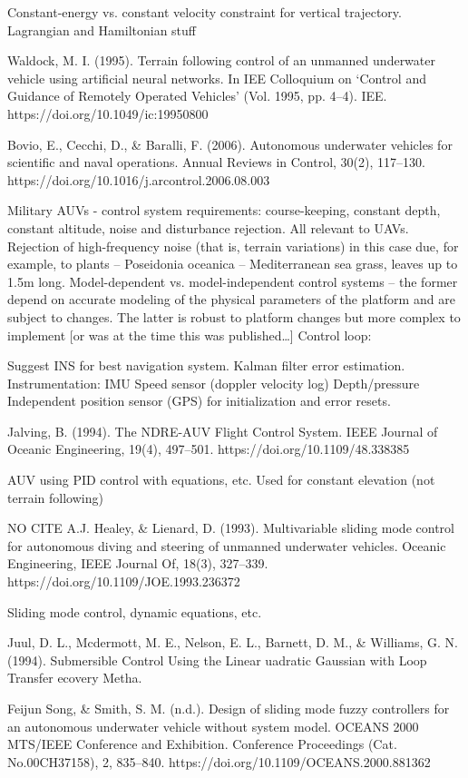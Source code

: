 Constant-energy vs. constant velocity constraint for vertical trajectory.
Lagrangian and Hamiltonian stuff

\cite{Waldock1995}
Waldock, M. I. (1995). Terrain following control of an unmanned underwater vehicle using artificial neural networks. In IEE Colloquium on `Control and Guidance of Remotely Operated Vehicles’ (Vol. 1995, pp. 4–4). IEE. https://doi.org/10.1049/ic:19950800

\cite{Bovio2006}
Bovio, E., Cecchi, D., \& Baralli, F. (2006). Autonomous underwater vehicles for scientific and naval operations. Annual Reviews in Control, 30(2), 117–130. https://doi.org/10.1016/j.arcontrol.2006.08.003

Military AUVs - control system requirements: course-keeping, constant depth, constant altitude, noise and disturbance rejection. All relevant to UAVs.
Rejection of high-frequency noise (that is, terrain variations) in this case due, for example, to plants -- Poseidonia oceanica -- Mediterranean sea grass, leaves up to 1.5m long.
Model-dependent vs. model-independent control systems -- the former depend on accurate modeling of the physical parameters of the platform and are subject to changes. The latter is robust to platform changes but more complex to implement [or was at the time this was published…]
Control loop:

Suggest INS for best navigation system.
Kalman filter error estimation.
Instrumentation:
IMU
Speed sensor (doppler velocity log)
Depth/pressure
Independent position sensor (GPS) for initialization and error resets.

\cite{Jalving1994}
Jalving, B. (1994). The NDRE-AUV Flight Control System. IEEE Journal of Oceanic Engineering, 19(4), 497–501. https://doi.org/10.1109/48.338385

AUV using PID control with equations, etc.
Used for constant elevation (not terrain following)

NO CITE
A.J. Healey, \& Lienard, D. (1993). Multivariable sliding mode control for autonomous diving and steering of unmanned underwater vehicles. Oceanic Engineering, IEEE Journal Of, 18(3), 327–339. https://doi.org/10.1109/JOE.1993.236372

Sliding mode control, dynamic equations, etc.

\cite{Juul1994}
Juul, D. L., Mcdermott, M. E., Nelson, E. L., Barnett, D. M., \& Williams, G. N. (1994). Submersible Control Using the Linear uadratic Gaussian with Loop Transfer ecovery Metha.

\cite{FeijunSong}
Feijun Song, \& Smith, S. M. (n.d.). Design of sliding mode fuzzy controllers for an autonomous underwater vehicle without system model. OCEANS 2000 MTS/IEEE Conference and Exhibition. Conference Proceedings (Cat. No.00CH37158), 2, 835–840. https://doi.org/10.1109/OCEANS.2000.881362

